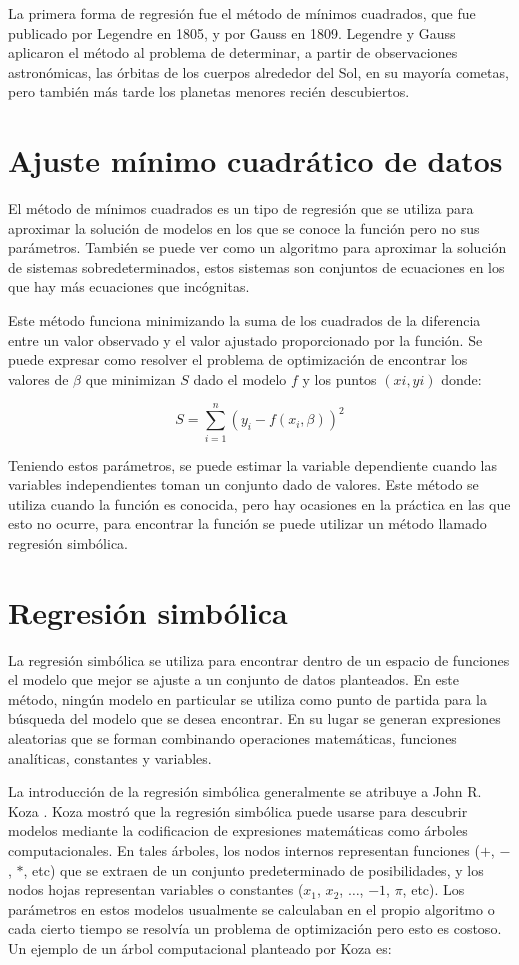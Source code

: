 La primera forma de regresión fue el método de mínimos cuadrados, que fue publicado por Legendre en 1805, y por Gauss en 1809. Legendre y Gauss aplicaron el método al problema de determinar, a partir de observaciones astronómicas, las órbitas de los cuerpos alrededor del Sol, en su mayoría cometas, pero también más tarde los planetas menores recién descubiertos.

\section{Ajuste mínimo cuadrático de datos}

El método de mínimos cuadrados es un tipo de regresión que se utiliza para aproximar la solución de modelos en los que se conoce la función pero no sus parámetros. También se puede ver como un algoritmo para aproximar la solución de sistemas sobredeterminados, estos sistemas son conjuntos de ecuaciones en los que hay más ecuaciones que incógnitas.

Este método funciona minimizando la suma de los cuadrados de la diferencia entre un valor observado y el valor ajustado proporcionado por la función. Se puede expresar como resolver el problema de optimización de encontrar los valores de $\beta$ que minimizan $S$ dado el modelo $f$ y los puntos $(xi, yi)$ donde:

$$S = \sum_{i=1}^{n}(y_i - f(x_i, \beta))^2$$

Teniendo estos parámetros, se puede estimar la variable dependiente cuando las variables independientes toman un conjunto dado de valores. Este método se utiliza cuando la función es conocida, pero hay ocasiones en la práctica en las que esto no ocurre, para encontrar la función se puede utilizar un método llamado regresión simbólica.

\section{Regresión simbólica}

La regresión simbólica se utiliza para encontrar dentro de un espacio de funciones el modelo que mejor se ajuste a un conjunto de datos planteados. En este método, ningún modelo en particular se utiliza como punto de partida para la búsqueda del modelo que se desea encontrar. En su lugar se generan expresiones aleatorias que se forman combinando operaciones matemáticas, funciones analíticas, constantes y variables.

La introducción de la regresión simbólica generalmente se atribuye a John R. Koza \cite{zelinka2005analytic}. Koza mostró que la regresión simbólica puede usarse para descubrir modelos mediante la codificacion de expresiones matemáticas como árboles computacionales. En tales árboles, los nodos internos representan funciones ($+$, $-$, $*$, etc) que se extraen de un conjunto predeterminado de posibilidades, y los nodos hojas representan variables o constantes ($x_1$, $x_2$, $\dots$, $-1$, $\pi$, etc). Los parámetros en estos modelos usualmente se calculaban en el propio algoritmo o cada cierto tiempo se resolvía un problema de optimización pero esto es costoso. Un ejemplo de un árbol computacional planteado por Koza es:

